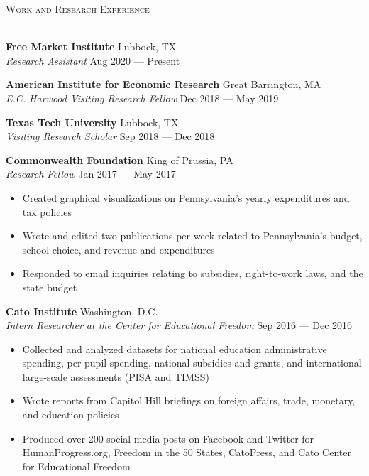\documentclass[a4paper,11pt]{article}
\newcommand{\lineunder} {
    \vspace*{-8pt} \\
    \hspace*{-18pt} \hrulefill \\
}
\newcommand{\header} [1] {
    {\hspace*{-18pt}\vspace*{6pt} \textsc{\large{#1}}}
    \vspace*{-6pt} \lineunder
}
\begin{document}
\header{Work and Research Experience}
\vspace{1mm}

\textbf{Free Market Institute} \hfill Lubbock, TX\\
\textit{Research Assistant} \hfill Aug 2020 --- Present \\
\vspace{1mm}

\textbf{American Institute for Economic Research} \hfill Great Barrington, MA\\
\textit{E.C. Harwood Visiting Research Fellow} \hfill Dec 2018 --- May 2019\\
\vspace{1mm}

\textbf{Texas Tech University} \hfill Lubbock, TX\\
\textit{Visiting Research Scholar} \hfill Sep 2018 --- Dec 2018\\
\vspace{1mm}

\textbf{Commonwealth Foundation} \hfill King of Prussia, PA\\
\textit{Research Fellow} \hfill Jan 2017 --- May 2017\\
\begin{itemize}[noitemsep,nolistsep]
    \item Created graphical visualizations on Pennsylvania’s yearly expenditures and tax policies
    \item Wrote and edited two publications per week related to Pennsylvania's budget, school choice, and revenue and expenditures
    \item Responded to email inquiries relating to subsidies, right-to-work laws, and the state budget
\end{itemize}
\vspace{1mm}

\textbf{Cato Institute} \hfill Washington, D.C.\\
\textit{Intern Researcher at the Center for Educational Freedom} \hfill Sep 2016 --- Dec 2016\\
\begin{itemize}[noitemsep,nolistsep]
    \item Collected and analyzed datasets for national education administrative spending, per-pupil spending, national subsidies and grants, and international large-scale assessments (PISA and TIMSS)
    \item Wrote reports from Capitol Hill briefings on foreign affairs, trade, monetary, and education policies
    \item Produced over 200 social media posts on Facebook and Twitter for HumanProgress.org, Freedom in the 50 States, CatoPress, and Cato Center for Educational Freedom
\end{itemize}
\vspace{2mm}
\end{document}
